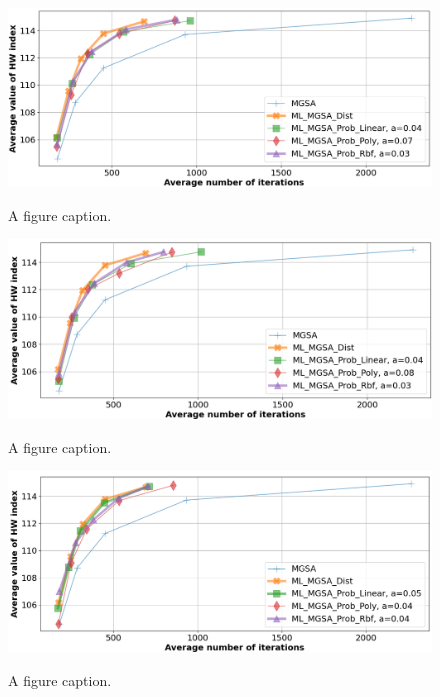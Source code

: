 \documentclass[runningheads]{llncs}
\begin{document}
\begin{figure}
\includegraphics[width=\textwidth]{fig3.png}
\label{fig:3}
\caption{A figure caption.} 
\end{figure}

\begin{figure}
\includegraphics[width=\textwidth]{fig4.png}
\label{fig:4}
\caption{A figure caption.} 
\end{figure}

\begin{figure}
\includegraphics[width=\textwidth]{fig5.png}
\label{fig:5}
\caption{A figure caption.} 
\end{figure}
\end{document}
